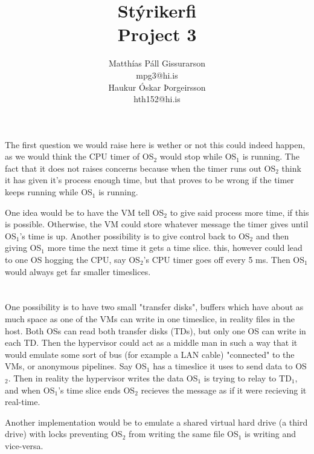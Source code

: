 \documentclass[10pt,a4paper]{article}
\begin{document}
\title{Stýrikerfi\\Project 3}
\author{Matthías Páll Gissurarson\\mpg3@hi.is\\Haukur Óskar Þorgeirsson\\hth152@hi.is}
\maketitle

\section{}

The first question we would raise here is wether or not this could indeed happen, as we would think the CPU timer of OS$_2$ would stop while OS$_1$ is running. The fact that it does not raises concerns because when the timer runs out OS$_2$ think it has given it's process enough time, but that proves to be wrong if the timer keeps running while OS$_1$ is running.

One idea would be to have the VM tell OS$_2$ to give said process more time, if this is possible. Otherwise, the VM could store whatever message the timer gives until OS$_1$'s time is up. Another possibility is to give control back to OS$_2$ and then giving OS$_1$ more time the next time it gets a time slice. this, however could lead to one OS hogging the CPU, say OS$_2$'s CPU timer goes off every 5 ms. Then OS$_1$ would always get far smaller timeslices.

\section{}

One possibility is to have two small "transfer disks", buffers which have about as much space as one of the VMs can write in one timeslice, in reality files in the host. Both OSs can read both transfer disks (TDs), but only one OS can write in each TD. Then the hypervisor could act as a middle man in such a way that it would emulate some sort of bus (for example a LAN cable) "connected" to the VMs, or anonymous pipelines. Say OS$_1$ has a timeslice it uses to send data to OS$_2$. Then in reality the hypervisor writes the data OS$_1$ is trying to relay to TD$_1$, and when OS$_1$'s time slice ends OS$_2$ recieves the message as if it were recieving it real-time.

Another implementation would be to emulate a shared virtual hard drive (a third drive) with locks preventing OS$_2$ from writing the same file OS$_1$ is writing and vice-versa.
\end{document}
